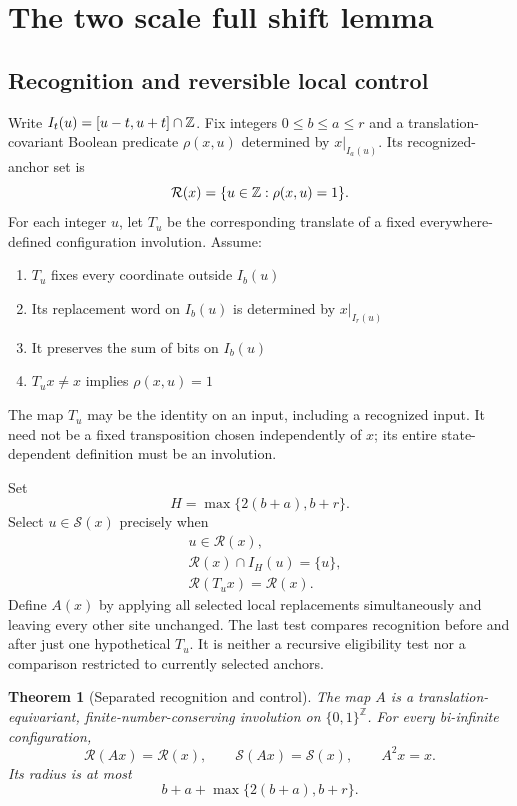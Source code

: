 \documentclass[11pt,a4paper]{article}
\numberwithin{equation}{section}
\newtheorem{theorem}{Theorem}[section]
\newcommand{\X}{\{0,1\}^{\mathbb Z}}\newcommand{\id}{\operatorname{id}}
\newcommand{\Rec}{\mathcal R}\newcommand{\Sel}{\mathcal S}
\begin{document}
\section{The two scale full shift lemma}\label{fpa:tr:sec:lemma}
\subsection{Recognition and reversible local control}
Write $I_t(u)=[u-t,u+t]\cap\mathbb Z$. Fix integers $0\le b\le a\le r$ and a translation-covariant Boolean predicate $\rho(x,u)$ determined by $x|_{I_a(u)}$. Its recognized-anchor set is
\[
\Rec(x)=\{u\in\Z:\rho(x,u)=1\}.
\]
For each integer $u$, let $T_u$ be the corresponding translate of a fixed everywhere-defined configuration involution. Assume:
\begin{enumerate}
\item $T_u$ fixes every coordinate outside $I_b(u)$
\item Its replacement word on $I_b(u)$ is determined by $x|_{I_r(u)}$
\item It preserves the sum of bits on $I_b(u)$
\item $T_u x\ne x$ implies $\rho(x,u)=1$
\end{enumerate}
The map $T_u$ may be the identity on an input, including a recognized input. It need not be a fixed transposition chosen independently of $x$; its entire state-dependent definition must be an involution.

Set
\begin{equation}\label{fpa:tr:eq:H}
H=\max\{2(b+a),b+r\}.
\end{equation}
Select $u\in\Sel(x)$ precisely when
\begin{align}
&u\in\Rec(x),\label{fpa:tr:eq:selected-rec}\\
&\Rec(x)\cap I_H(u)=\{u\},\label{fpa:tr:eq:selected-isol}\\
&\Rec(T_u x)=\Rec(x).\label{fpa:tr:eq:selected-pros}
\end{align}
Define $A(x)$ by applying all selected local replacements simultaneously and leaving every other site unchanged. The last test compares recognition before and after just one hypothetical $T_u$. It is neither a recursive eligibility test nor a comparison restricted to currently selected anchors.

\begin{theorem}[Separated recognition and control]\label{fpa:tr:thm:two-scale}
The map $A$ is a translation-equivariant, finite-number-conserving involution on $\X$. For every bi-infinite configuration,
\[
\Rec(Ax)=\Rec(x),\qquad \Sel(Ax)=\Sel(x),\qquad A^2x=x.
\]
Its radius is at most
\begin{equation}\label{fpa:tr:eq:abstract-radius}
b+a+\max\{2(b+a),b+r\}.
\end{equation}
\end{theorem}
\end{document}
